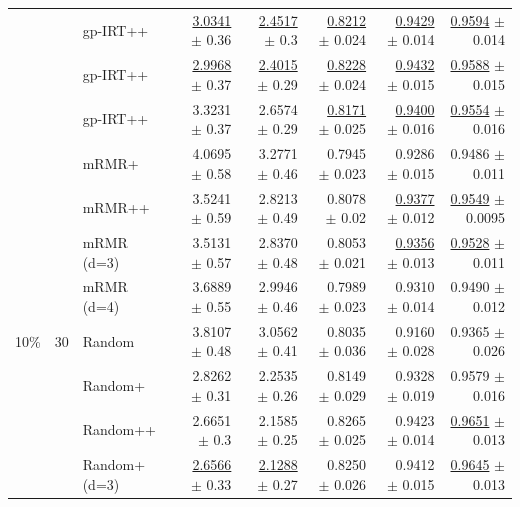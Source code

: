 \begin{longtable}{llp{}rrrrr}
 &  & gp-IRT++ & \underline{3.0341} {\scriptsize $\pm$ 0.36} & \underline{2.4517} {\scriptsize $\pm$ 0.3} & \underline{0.8212} {\scriptsize $\pm$ 0.024} & \underline{0.9429} {\scriptsize $\pm$ 0.014} & \underline{0.9594} {\scriptsize $\pm$ 0.014} \\
 &  & gp-IRT++ & \underline{2.9968} {\scriptsize $\pm$ 0.37} & \underline{2.4015} {\scriptsize $\pm$ 0.29} & \underline{0.8228} {\scriptsize $\pm$ 0.024} & \underline{0.9432} {\scriptsize $\pm$ 0.015} & \underline{0.9588} {\scriptsize $\pm$ 0.015} \\
 &  & gp-IRT++ & 3.3231 {\scriptsize $\pm$ 0.37} & 2.6574 {\scriptsize $\pm$ 0.29} & \underline{0.8171} {\scriptsize $\pm$ 0.025} & \underline{0.9400} {\scriptsize $\pm$ 0.016} & \underline{0.9554} {\scriptsize $\pm$ 0.016} \\
 &  & mRMR+ & 4.0695 {\scriptsize $\pm$ 0.58} & 3.2771 {\scriptsize $\pm$ 0.46} & 0.7945 {\scriptsize $\pm$ 0.023} & 0.9286 {\scriptsize $\pm$ 0.015} & 0.9486 {\scriptsize $\pm$ 0.011} \\
 &  & mRMR++ & 3.5241 {\scriptsize $\pm$ 0.59} & 2.8213 {\scriptsize $\pm$ 0.49} & 0.8078 {\scriptsize $\pm$ 0.02} & \underline{0.9377} {\scriptsize $\pm$ 0.012} & \underline{0.9549} {\scriptsize $\pm$ 0.0095} \\
 &  & mRMR (d=3) & 3.5131 {\scriptsize $\pm$ 0.57} & 2.8370 {\scriptsize $\pm$ 0.48} & 0.8053 {\scriptsize $\pm$ 0.021} & \underline{0.9356} {\scriptsize $\pm$ 0.013} & \underline{0.9528} {\scriptsize $\pm$ 0.011} \\
 &  & mRMR (d=4) & 3.6889 {\scriptsize $\pm$ 0.55} & 2.9946 {\scriptsize $\pm$ 0.46} & 0.7989 {\scriptsize $\pm$ 0.023} & 0.9310 {\scriptsize $\pm$ 0.014} & 0.9490 {\scriptsize $\pm$ 0.012} \\
\midrule
10\% & 30 & Random & 3.8107 {\scriptsize $\pm$ 0.48} & 3.0562 {\scriptsize $\pm$ 0.41} & 0.8035 {\scriptsize $\pm$ 0.036} & 0.9160 {\scriptsize $\pm$ 0.028} & 0.9365 {\scriptsize $\pm$ 0.026} \\
 &  & Random+ & 2.8262 {\scriptsize $\pm$ 0.31} & 2.2535 {\scriptsize $\pm$ 0.26} & 0.8149 {\scriptsize $\pm$ 0.029} & 0.9328 {\scriptsize $\pm$ 0.019} & 0.9579 {\scriptsize $\pm$ 0.016} \\
 &  & Random++ & 2.6651 {\scriptsize $\pm$ 0.3} & 2.1585 {\scriptsize $\pm$ 0.25} & 0.8265 {\scriptsize $\pm$ 0.025} & 0.9423 {\scriptsize $\pm$ 0.014} & \underline{0.9651} {\scriptsize $\pm$ 0.013} \\
 &  & Random+ (d=3) & \underline{2.6566} {\scriptsize $\pm$ 0.33} & \underline{2.1288} {\scriptsize $\pm$ 0.27} & 0.8250 {\scriptsize $\pm$ 0.026} & 0.9412 {\scriptsize $\pm$ 0.015} & \underline{0.9645} {\scriptsize $\pm$ 0.013} \\

\end{longtable}
